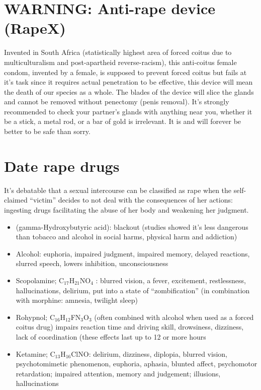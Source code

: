 \section*{WARNING: Anti-rape device (RapeX)}

Invented in South Africa (statistically highest area of forced coitus due to 
multiculturalism and post-apartheid reverse-racism), this anti-coitus female 
condom, invented by a female, is supposed to prevent forced coitus but fails at 
it’s task since it requires actual penetration to be effective, this device 
will mean the death of our species as a whole.
The blades of the device will slice the glands and cannot be removed without 
penectomy (penis removal). It’s strongly recommended to check your partner’s 
glands with anything near you, whether it be a stick, a metal rod, or a bar of 
gold is irrelevant. It is and will forever be better to be safe than sorry.



\section*{Date rape drugs}

It’s debatable that a sexual intercourse can be classified as rape when the 
self-claimed “victim” decides to not deal with the consequences of her actions: 
ingesting drugs facilitating the abuse of her body and weakening her judgment.
\begin{itemize}
\item (gamma-Hydroxybutyric acid): blackout (studies showed it’s less dangerous than tobacco and alcohol in social harms, physical harm and addiction)

\item Alcohol: euphoria, impaired judgment, impaired memory, delayed reactions, slurred speech, lowers inhibition, unconsciousness

\item Scopolamine; C$_{17}$H$_{21}$NO$_4$ : blurred vision, a fever, excitement, restlessness, hallucinations, delirium, put into a state of “zombification” (in combination with morphine: amnesia, twilight sleep)
\item Rohypnol; C$_{16}$H$_{12}$FN$_{3}$O$_{3}$   (often combined with alcohol when used as a forced coitus drug) impairs reaction time and driving skill, drowsiness, dizziness, lack of coordination (these effects last up to 12 or more hours

\item Ketamine; C$_{13}$H$_{16}$ClNO: delirium, dizziness, diplopia, blurred vision, psychotomimetic phenomenon, euphoria, aphasia, blunted affect, psychomotor retardation; impaired attention, memory and judgement; illusions, hallucinations
\end{itemize}

